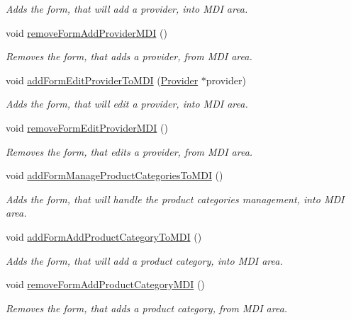 \begin{DoxyCompactItemize}
\begin{DoxyCompactList}\small\item\em \-Adds the form, that will add a provider, into \-M\-D\-I area. \end{DoxyCompactList}\item 
void \hyperlink{class_main_window_a8a37a007d05add33d2c1b48c7f26afcb}{remove\-Form\-Add\-Provider\-M\-D\-I} ()
\begin{DoxyCompactList}\small\item\em \-Removes the form, that adds a provider, from \-M\-D\-I area. \end{DoxyCompactList}\item 
void \hyperlink{class_main_window_a17a3a7ed4c6b3df106c8ee1e7cd65707}{add\-Form\-Edit\-Provider\-To\-M\-D\-I} (\hyperlink{class_provider}{\-Provider} $\ast$provider)
\begin{DoxyCompactList}\small\item\em \-Adds the form, that will edit a provider, into \-M\-D\-I area. \end{DoxyCompactList}\item 
void \hyperlink{class_main_window_a653378b6744dded8fcfeaefc83330272}{remove\-Form\-Edit\-Provider\-M\-D\-I} ()
\begin{DoxyCompactList}\small\item\em \-Removes the form, that edits a provider, from \-M\-D\-I area. \end{DoxyCompactList}\item 
void \hyperlink{class_main_window_aaafa1ee1e885547b1d6340e384d34c13}{add\-Form\-Manage\-Product\-Categories\-To\-M\-D\-I} ()
\begin{DoxyCompactList}\small\item\em \-Adds the form, that will handle the product categories management, into \-M\-D\-I area. \end{DoxyCompactList}\item 
void \hyperlink{class_main_window_af81bb1c2ebddc26a77519d2711ef166c}{add\-Form\-Add\-Product\-Category\-To\-M\-D\-I} ()
\begin{DoxyCompactList}\small\item\em \-Adds the form, that will add a product category, into \-M\-D\-I area. \end{DoxyCompactList}\item 
void \hyperlink{class_main_window_aef1d9e51f34909684ba22816124f7f12}{remove\-Form\-Add\-Product\-Category\-M\-D\-I} ()
\begin{DoxyCompactList}\small\item\em \-Removes the form, that adds a product category, from \-M\-D\-I area. \end{DoxyCompactList}\item 

\end{DoxyCompactItemize}
